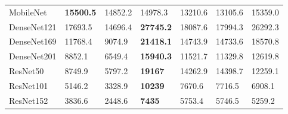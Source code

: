 \begin{table}
\begin{tabular}{lllllll}
    MobileNet   & \textbf{15500.5}   & 14852.2      & 14978.3 & 13210.6 & 13105.6 & 15359.0   \\
    DenseNet121 & 17693.5   & 14696.4      & \textbf{27745.2} & 18087.6 & 17994.3 & 26292.3 \\
    DenseNet169 & 11768.4   & 9074.9       & \textbf{21418.1} & 14743.9 & 14733.6 & 18570.8 \\
    DenseNet201 & 8852.1    & 6549.4       & \textbf{15940.3} & 11521.7 & 11329.8 & 12619.8 \\
    ResNet50    & 8749.9    & 5797.2       & \textbf{19167}   & 14262.9 & 14398.7 & 12259.1 \\
    ResNet101   & 5146.2    & 3328.9       & \textbf{10239}   & 7670.6  & 7716.5  & 6908.1  \\
    ResNet152   & 3836.6    & 2448.6       & \textbf{7435}    & 5753.4  & 5746.5  & 5259.2  \\
    \end{tabular}
    \label{tbl:pap_hvd_narval_full}
\end{table}